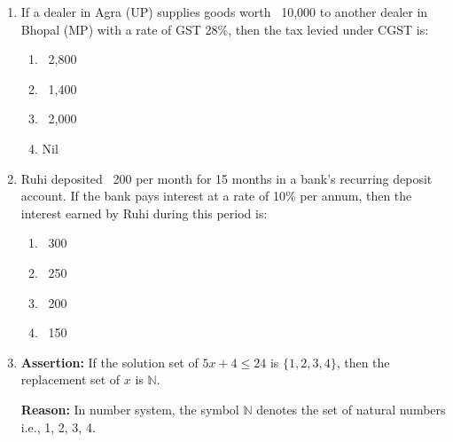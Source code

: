 \begin{enumerate}[label=(\roman*)]

    \item If a dealer in Agra (UP) supplies goods worth \rupee~10,000 to another
        dealer in Bhopal (MP) with a rate of GST 28\%, then the tax levied 
        under CGST is:

        \begin{multicols}{4}
        \begin{enumerate}[label=(\alph*)]
            \item \rupee~2,800
            \item \rupee~1,400
            \item \rupee~2,000
            \item Nil
        \end{enumerate}
        \end{multicols}

    \newpage
    \item Ruhi deposited \rupee~200 per month for 15 months in a bank's recurring 
        deposit account. If the bank pays interest at a rate of 10\% per annum, 
        then the interest earned by Ruhi during this period is:

        \begin{multicols}{2}
        \begin{enumerate}[label=(\alph*)]
            \item \rupee~300
            \item \rupee~250
            \item \rupee~200
            \item \rupee~150
        \end{enumerate}
        \end{multicols}

    \item \textbf{Assertion:} If the solution set of $5x+4 \leq 24$ is 
        $\{1,2,3,4\}$, then the replacement set of $x$ is $\mathbb{N}$.

        \textbf{Reason:} In number system, the symbol $\mathbb{N}$ denotes 
        the set of natural numbers i.e., 1, 2, 3, 4.


\end{enumerate}

